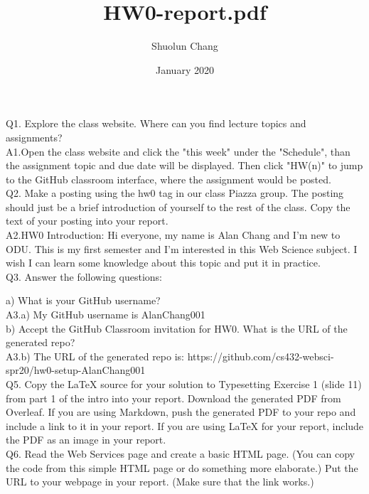 \documentclass{article}
\title{HW0-report.pdf}
\author{Shuolun Chang }
\date{January 2020}
\begin{document}
\maketitle
Q1. Explore the class website. Where can you find lecture topics and assignments?\\

A1.Open the class website and click the "this week" under the "Schedule", than the assignment topic and due date will be displayed. Then click "HW(n)" to jump to the GitHub classroom interface, where the assignment would be posted.\\

Q2. Make a posting using the hw0 tag in our class Piazza group. The posting should just be a brief introduction of yourself to the rest of the class. Copy the text of your posting into your report.\\

A2.HW0 Introduction: 
Hi everyone, my name is Alan Chang and I'm new to ODU. This is my first semester and I'm interested in this Web Science subject. I wish I can learn some knowledge about this topic and put it in practice. \\



Q3. Answer the following questions:

a) What is your GitHub username?\\


A3.a) My GitHub username is AlanChang001\\

b) Accept the GitHub Classroom invitation for HW0. What is the URL of the generated repo?\\

A3.b) The URL of the generated repo is: https://github.com/cs432-websci-spr20/hw0-setup-AlanChang001\\


Q5. Copy the LaTeX source for your solution to Typesetting Exercise 1 (slide 11) from part 1 of the intro into your report. Download the generated PDF from Overleaf. If you are using Markdown, push the generated PDF to your repo and include a link to it in your report. If you are using LaTeX for your report, include the PDF as an image in your report.
\\

Q6. Read the Web Services page and create a basic HTML page. (You can copy the code from this simple HTML page or do something more elaborate.) Put the URL to your webpage in your report. (Make sure that the link works.)\\
\end{document}
